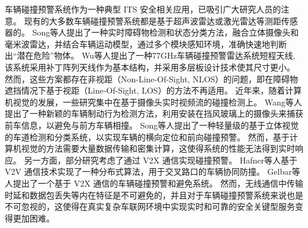 车辆碰撞预警系统作为一种典型 ITS 安全相关应用，已吸引广大研究人员的注意。
现有的大多数车辆碰撞预警系统都是基于超声波雷达或激光雷达等测距传感器的。
Song等人\cite{song2018real}提出了一种实时障碍物检测和状态分类方法，融合立体摄像头和毫米波雷达，并结合车辆运动模型，通过多个模块感知环境，准确快速地判断出“潜在危险”物体。
Wu等人\cite{wu2019series}提出了一种77GHz车辆碰撞预警雷达系统短程天线,该系统采用补丁阵列天线作为基本结构，并采用多层板设计技术使其尺寸更小。
然而，这些方案都存在非视距（Non-Line-Of-Sight, NLOS）的问题，即在障碍物遮挡情况下基于视距（Line-Of-Sight, LOS）的方法不再适用。
近年来，随着计算机视觉的发展，一些研究集中在基于摄像头实时视频流的碰撞检测上。
Wang等人\cite{wang2016vision}提出了一种新颖的车辆制动行为检测方法，利用安装在挡风玻璃上的摄像头来捕获前车信息，以避免与前方车辆相撞。
Song等人\cite{song2018lane}提出了一种轻量级的基于立体视觉的车道检测和分类系统，以实现车辆的横向定位和前向碰撞预警。
然而，基于计算机视觉的方法需要大量数据传输和密集计算，这使得系统的性能无法得到实时响应。 
另一方面，部分研究考虑了通过 V2X 通信实现碰撞预警。
Hafner等人\cite{hafner2013cooperative}基于 V2V 通信技术实现了一种分布式算法，用于交叉路口的车辆协同防撞。
Gelbar等人\cite{gelbal2017elastic}提出了一个基于 V2X 通信的车辆碰撞预警和避免系统。
然而，无线通信中传输时延和数据包丢失等内在特征是不可避免的，并且对于车辆碰撞预警系统来说也是不可忽视的，这使得在真实复杂车联网环境中实现实时和可靠的安全关键型服务变得更加困难。

